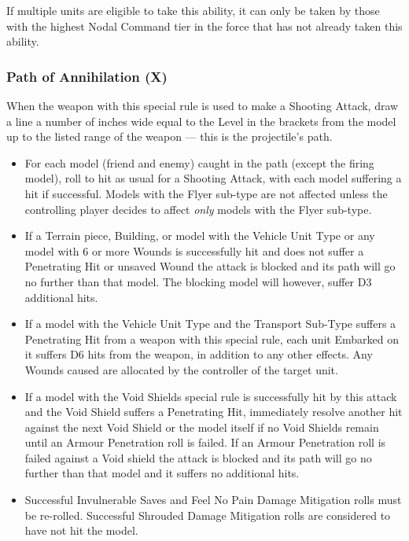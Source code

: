 \begin{multicols}{2}
If multiple units are eligible to take this ability, it can only be taken by those with the highest Nodal Command tier in the force that has not already taken this ability. 

\subsubsection{Path of Annihilation (X)} \label{Path of Annihilation}

When the weapon with this special rule is used to make a Shooting Attack, draw a line a number of inches wide equal to the Level in the brackets from the model up to the listed range of the weapon — this is the projectile's path.

\begin{itemize}
	\item For each model (friend and enemy) caught in the path (except the firing model), roll to hit as usual for a Shooting Attack, with each model suffering a hit if successful. Models with the Flyer sub-type are not affected unless the controlling player decides to affect \textit{only} models with the Flyer sub-type.
	\item If a Terrain piece, Building, or model with the Vehicle Unit Type or any model with 6 or more Wounds is successfully hit and does not suffer a Penetrating Hit or unsaved Wound the attack is blocked and its path will go no further than that model. The blocking model will however, suffer D3 additional hits.
	\item If a model with the Vehicle Unit Type and the Transport Sub-Type suffers a Penetrating Hit from a weapon with this special rule, each unit Embarked on it suffers D6 hits from the weapon, in addition to any other effects. Any Wounds caused are allocated by the controller of the target unit.
	\item If a model with the Void Shields special rule is successfully hit by this attack and the Void Shield suffers a Penetrating Hit, immediately resolve another hit against the next Void Shield or the model itself if no Void Shields remain until an Armour Penetration roll is failed. If an Armour Penetration roll is failed against a Void shield the attack is blocked and its path will go no further than that model and it suffers no additional hits.
	\item Successful Invulnerable Saves and Feel No Pain Damage Mitigation rolls must be re-rolled. Successful Shrouded Damage Mitigation rolls are considered to have not hit the model.
\end{itemize}


\end{multicols}
